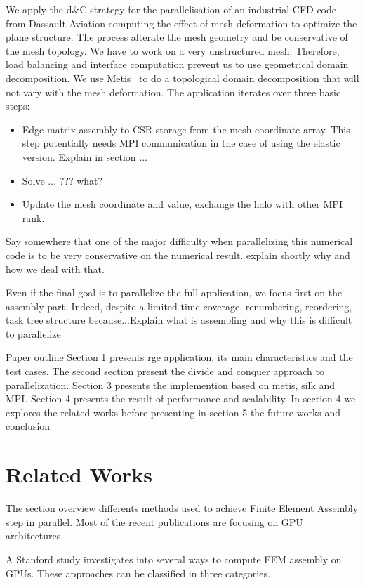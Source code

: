 \documentclass{IOS-Book-Article}
\begin{document}
We apply the d\&C strategy for the parallelisation of an industrial CFD code from Dassault Aviation computing the effect of mesh deformation to optimize the plane structure.
The process alterate the mesh geometry and be conservative of the mesh topology.  We have to work on a very unstructured mesh. Therefore, load balancing and interface
computation prevent us to use geometrical domain decomposition.
We use Metis~\cite{Metis} to do a topological domain decomposition that will not vary with the mesh deformation.
The application iterates over three basic steps:
\begin{itemize}
\item Edge matrix assembly to CSR storage from the mesh coordinate array. This step potentially needs MPI communication in the case of using the elastic version.
Explain in section ...
\item Solve ... ??? what?
\item Update the mesh coordinate and value, exchange the halo with other MPI rank.
\end{itemize}
Say somewhere that one of the major difficulty when parallelizing this numerical code is to be very conservative on the numerical result. explain shortly why and how we deal
with that.


Even if the final goal is to parallelize the full application, we focus first on the assembly part. Indeed, despite a limited time coverage, renumbering, reordering,
task tree structure because...Explain what is assembling and why this is difficult to parallelize



Paper outline
Section 1 presents rge application, its main characteristics and the test cases.
The second section present the divide and conquer approach to parallelization. 
Section 3 presents the implemention based on metis, silk and MPI.
Section 4 presents the result of performance and scalability. 
In section 4 we explores the related works before presenting in section 5 the future works and conclusion

\section{Related Works}
The section overview differents methods used to achieve Finite Element Assembly step in parallel.
Most of the recent publications are focusing on GPU architectures.

A Stanford study \cite{Stanford} investigates into several ways to compute FEM assembly on GPUs.
These approaches can be classified in three categories.
\end{document}
